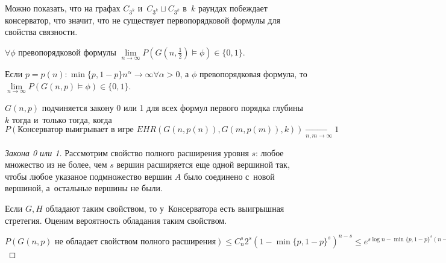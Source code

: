 \documentclass{article}
\begin{document}
Можно показать, что на графах $C_{3^k}$ и~$C_{3^k} \sqcup C_{3^k}$ в~$k$
раундах побеждает консерватор, что значит, что не существует первопорядковой формулы для свойства
связности.

\begin{theorem}
	$\forall \phi$ превопорядковой формулы $\lim\limits_{n\rightarrow \infty} P(G(n, \frac{1}{2})
	\models \phi) \in \{0, 1\}$.
\end{theorem}
\begin{theorem}
	Если $p = p(n): \min\{p, 1-p\} n^\alpha \rightarrow \infty \forall \alpha > 0$, а
	$\phi$ превопорядковая формула, то $\lim\limits_{n\rightarrow \infty} P(G(n, p) \models \phi)
	\in \{0, 1\}$.
\end{theorem}

\begin{corollary}
	$G(n, p)$ подчиняется закону 0 или 1 для всех формул первого порядка глубины $k$ тогда и~только
	тогда, когда $$P(\text{Консерватор выигрывает в~игре } EHR(G(n, p(n)), G(m, p(m)), k))
	\underset{n,m \rightarrow \infty} \rightarrow 1$$
\end{corollary}

\begin{proof}[Закона 0 или 1]
	Рассмотрим свойство полного расширения уровня $s$: любое множество из не более, чем $s$ вершин
	расширяется еще одной вершиной так, чтобы любое указаное подмножество вершин $A$ было соединено
	с~новой вершиной, а~остальные вершины не были.

	Если $G, H$ обладают таким свойством, то у~Консерватора есть выигрышная стретегия. Оценим
	вероятность обладания таким свойством.

	$P(G(n, p) \text{ не обладает свойством полного расширения}) \le C_n^s 2^s (1 - \min\{p, 1 -
	p\}^s)^{n-s} \le e^{s \log n - \min\{p, 1 - p\}^s (n - s)} \rightarrow 0$
\end{proof}
\end{document}
